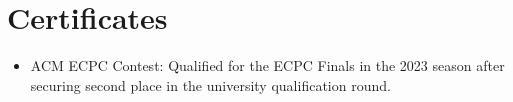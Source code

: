 \documentclass[letterpaper,11pt]{article}
\newcommand{\resumeItem}[1]{\item\small{{#1 \vspace{-2pt}}}}
\newcommand{\resumeItemListStart}{\begin{itemize}}
\newcommand{\resumeItemListEnd}{\end{itemize}\vspace{-5pt}}
\begin{document}
\section{Certificates}
\resumeItemListStart
    \resumeItem{ACM ECPC Contest: Qualified for the ECPC Finals in the 2023 season after securing second place in the university qualification round.}
\resumeItemListEnd
\end{document}
